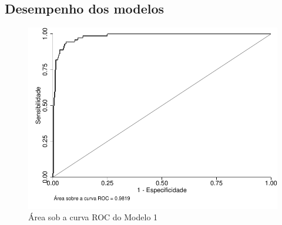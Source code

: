 \begin{apendicesenv}
\chapter{Desempenho dos modelos}
\label{chap:desempenho}

\begin{figure}[htb]
	\label{fig:figura4}
	\caption{Área sob a curva ROC do Modelo 1}
	\begin{center}
	    \includegraphics[scale=1]{roc1.pdf}
	\end{center}
\end{figure}

\end{apendicesenv}